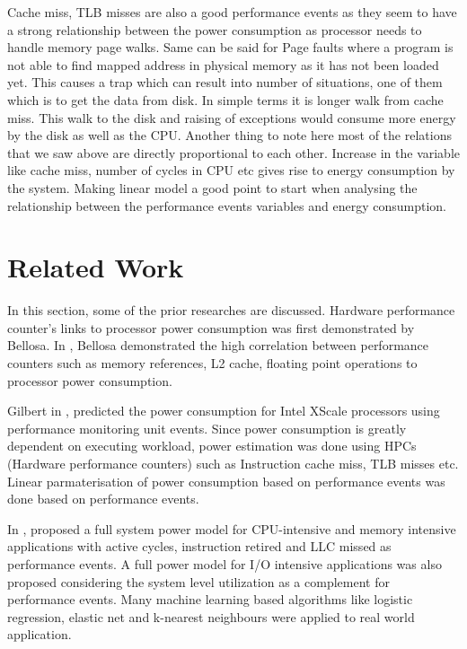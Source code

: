 Cache miss, TLB misses are also a good performance events as they seem to have a strong relationship between the power consumption as processor needs to handle memory page walks. Same can be said for Page faults where a program is not able to find mapped address in physical memory as it has not been loaded yet. This causes a trap which can result into number of situations, one of them which is to get the data from disk. In simple terms it is longer walk from cache miss. This walk to the disk and raising of exceptions would consume more energy by the disk as well as the CPU. Another thing to note here most of the relations that we saw above are directly proportional to each other. Increase in the variable like cache miss, number of cycles in CPU etc gives rise to energy consumption by the system. Making linear model a good point to start when analysing the relationship between the performance events variables and energy consumption.

\section{Related Work}

In this section, some of the prior researches are discussed. Hardware performance counter's links to processor power consumption was first demonstrated by Bellosa. In \cite{bellosa2000benefits}, Bellosa demonstrated the high correlation between performance counters such as memory references, L2 cache, floating point operations to processor power consumption.

Gilbert in \cite{gilberto2005power}, predicted the power consumption for Intel XScale processors using performance monitoring unit events. Since power consumption is greatly dependent on executing workload, power estimation was done using HPCs (Hardware performance counters) such as Instruction cache miss, TLB misses etc. Linear parmaterisation of power consumption based on performance events was done based on performance events. 

In \cite{yang2016performance}, proposed a full system power model for CPU-intensive and memory intensive applications with active cycles, instruction retired and LLC missed as performance events. A full power model for I/O intensive applications was also proposed considering the system level utilization as a complement for performance events. Many machine learning based algorithms like logistic regression, elastic net and k-nearest neighbours were applied to real world application. 

